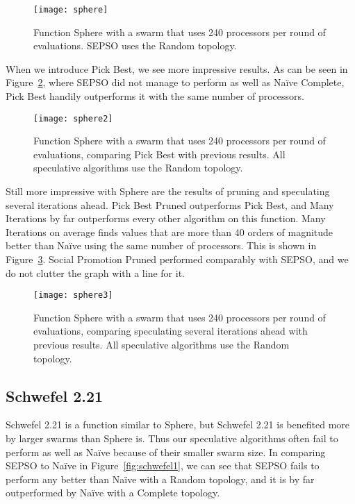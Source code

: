 \documentclass[smallcondensed]{svjour3}
\newcommand{\fig}[1]{Figure~\ref{fig:#1}}
\begin{document}
\begin{figure}
  \centering
  \texttt{[image: sphere]}
  \caption{Function Sphere with a swarm that uses 240 processors per round of
  evaluations.  SEPSO uses the Random topology.}
  \label{fig:basic-sphere}
\end{figure}

When we introduce Pick Best, we see more impressive results.  As can be seen in
\fig{sphere-pickbest}, where SEPSO did not manage to perform as well as Na\"ive
Complete, Pick Best handily outperforms it with the same number of processors.

\begin{figure}
  \centering
  \texttt{[image: sphere2]}
  \caption{Function Sphere with a swarm that uses 240 processors per round of
  evaluations, comparing Pick Best with previous results.  All speculative
  algorithms use the Random topology.}
  \label{fig:sphere-pickbest}
\end{figure}

Still more impressive with Sphere are the results of pruning and speculating
several iterations ahead.  Pick Best Pruned outperforms Pick Best, and Many
Iterations by far outperforms every other algorithm on this function.  Many
Iterations on average finds values that are more than 40 orders of magnitude
better than Na\"ive using the same number of processors.  This is shown in
\fig{sphere-manyiters}.  Social Promotion Pruned performed comparably with
SEPSO, and we do not clutter the graph with a line for it.

\begin{figure}
  \centering
  \texttt{[image: sphere3]}
  \caption{Function Sphere with a swarm that uses 240 processors per round of
  evaluations, comparing speculating several iterations ahead with previous
  results.  All speculative algorithms use the Random topology.}
  \label{fig:sphere-manyiters}
\end{figure}

\subsection{Schwefel 2.21}

Schwefel 2.21 is a function similar to Sphere, but Schwefel 2.21 is benefited
more by larger swarms than Sphere is.  Thus our speculative algorithms often
fail to perform as well as Na\"ive because of their smaller swarm size.  In
comparing SEPSO to Na\"ive in \fig{schwefel1}, we can see that SEPSO fails to
perform any better than Na\"ive with a Random topology, and it is by far
outperformed by Na\"ive with a Complete topology.
\end{document}
